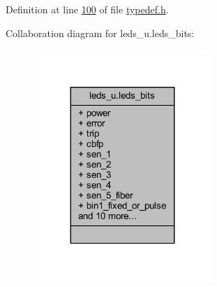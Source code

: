 Definition at line \hyperlink{a00001_source_l00100}{100} of file \hyperlink{a00001_source}{typedef.\+h}.



Collaboration diagram for leds\+\_\+u.\+leds\+\_\+bits\+:
\nopagebreak
\begin{figure}[H]
\begin{center}
\leavevmode
\includegraphics[width=191pt]{d3/d1a/a00251}
\end{center}
\end{figure}

